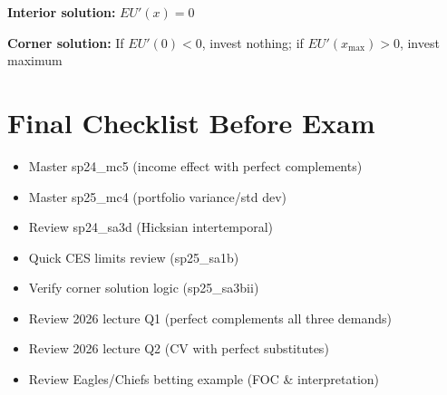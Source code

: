 \documentclass[11pt]{article}
\begin{document}
\textbf{Interior solution:} $EU'(x) = 0$

\textbf{Corner solution:} If $EU'(0) < 0$, invest nothing; if $EU'(x_{\max}) > 0$, invest maximum

\section*{Final Checklist Before Exam}

\begin{itemize}[leftmargin=*]
    \item[$\square$] Master sp24\_mc5 (income effect with perfect complements)
    \item[$\square$] Master sp25\_mc4 (portfolio variance/std dev)
    \item[$\square$] Review sp24\_sa3d (Hicksian intertemporal)
    \item[$\square$] Quick CES limits review (sp25\_sa1b)
    \item[$\square$] Verify corner solution logic (sp25\_sa3bii)
    \item[$\square$] Review 2026 lecture Q1 (perfect complements all three demands)
    \item[$\square$] Review 2026 lecture Q2 (CV with perfect substitutes)
    \item[$\square$] Review Eagles/Chiefs betting example (FOC \& interpretation)
\end{itemize}

\vspace{1cm}

\begin{center}
\end{center}
\end{document}
